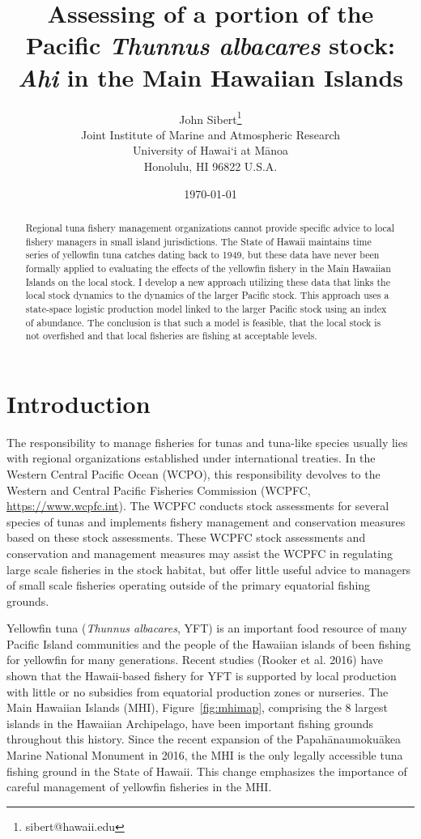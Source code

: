 \documentclass[12pt,letterpaper]{article}
\title{Assessing of a portion of the Pacific 
{\it Thunnus albacares} stock:\\[0.125in]
{\it Ahi} in the Main Hawaiian Islands}
\author{
John Sibert\thanks{sibert@hawaii.edu}\\
Joint Institute of Marine and Atmospheric Research\\
University of Hawai`i at M\={a}noa\\
Honolulu, HI  96822 U.S.A.\\[0.125in]
\date{\today}
}
\newcommand\doublespacing{\baselineskip=1.6\normalbaselineskip}
\begin{document}
\maketitle


\begin{abstract}
Regional tuna fishery management organizations cannot provide specific
advice to local fishery managers in small island jurisdictions. The
State of Hawaii maintains time series of yellowfin tuna catches dating
back to 1949, but these data have never been formally applied to
evaluating the effects of the yellowfin fishery in the Main Hawaiian
Islands on the local stock. I develop a new approach utilizing these
data that links the local stock dynamics to the dynamics of the larger
Pacific stock. This approach uses a state-space logistic production
model linked to the larger Pacific stock using an index of abundance. The
conclusion is that such a model is feasible, that the local stock
is not overfished and that local fisheries are fishing at acceptable
levels.
\end{abstract}


\section*{Introduction}
The responsibility to manage fisheries for tunas and tuna-like
species usually
lies with regional organizations established under international treaties.
In the Western Central Pacific Ocean (WCPO), this responsibility devolves to
the Western and Central Pacific Fisheries Commission (WCPFC, 
\url{https://www.wcpfc.int}).
The WCPFC conducts stock assessments for several species of tunas and
implements fishery management and conservation measures based on
these stock assessments. 
These WCPFC stock assessments and conservation and management measures
may assist the WCPFC in regulating large scale fisheries in the stock
habitat, but offer little useful advice to managers of small scale
fisheries operating outside of the primary equatorial fishing grounds.

Yellowfin tuna ({\it Thunnus albacares}, YFT) is an important food resource
of many Pacific Island communities and the people of the Hawaiian
islands of been fishing for yellowfin for many generations. 
Recent studies (Rooker et al. 2016) have shown that the Hawaii-based
fishery for YFT is  supported by
local production with little or no subsidies from equatorial
production zones or nurseries.
The Main Hawaiian Islands (MHI), Figure~\ref{fig:mhimap},
comprising the 8 largest islands in the Hawaiian Archipelago,
have been important fishing grounds throughout this history.
Since the recent expansion of the Papah\={a}naumoku\={a}kea Marine National
Monument in 2016, the MHI is the only legally accessible tuna fishing ground
in the State of Hawaii.
This change emphasizes the importance of careful management of yellowfin
fisheries in the MHI.
\end{document}
